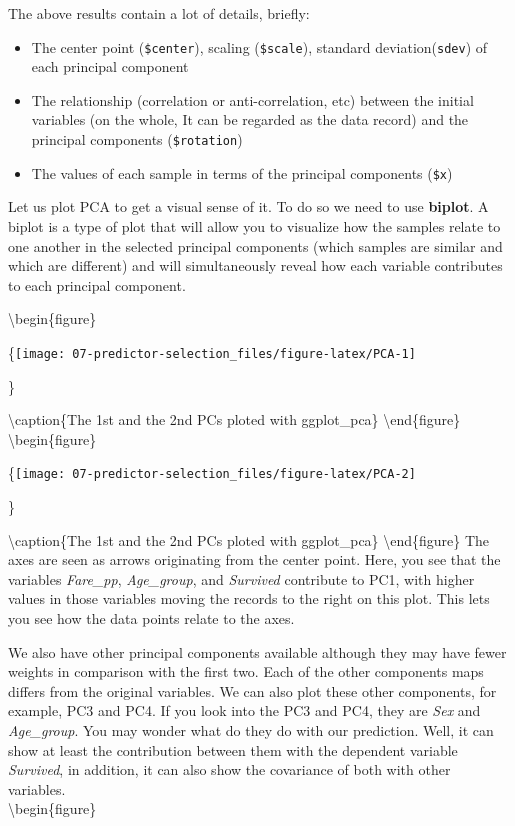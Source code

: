 \documentclass[
]{book}
\providecommand{\tightlist}{%
  \setlength{\itemsep}{0pt}\setlength{\parskip}{0pt}}
\begin{document}
The above results contain a lot of details, briefly:

\begin{itemize}
\tightlist
\item
  The center point (\texttt{\$center}), scaling (\texttt{\$scale}), standard deviation(\texttt{sdev}) of each principal component
\item
  The relationship (correlation or anti-correlation, etc) between the initial variables (on the whole, It can be regarded as the data record) and the principal components (\texttt{\$rotation})
\item
  The values of each sample in terms of the principal components (\texttt{\$x})
\end{itemize}

Let us plot PCA to get a visual sense of it. To do so we need to use \textbf{biplot}. A biplot is a type of plot that will allow you to visualize how the samples relate to one another in the selected principal components (which samples are similar and which are different) and will simultaneously reveal how each variable contributes to each principal component.

\textbackslash begin\{figure\}

\{\centering \texttt{[image: 07-predictor-selection\_files/figure-latex/PCA-1]}

\}

\textbackslash caption\{The 1st and the 2nd PCs ploted with ggplot\_pca\}\label{fig:PCA-1}
\textbackslash end\{figure\}
\textbackslash begin\{figure\}

\{\centering \texttt{[image: 07-predictor-selection\_files/figure-latex/PCA-2]}

\}

\textbackslash caption\{The 1st and the 2nd PCs ploted with ggplot\_pca\}\label{fig:PCA-2}
\textbackslash end\{figure\}
The axes are seen as arrows originating from the center point. Here, you see that the variables \emph{Fare\_pp}, \emph{Age\_group}, and \emph{Survived} contribute to PC1, with higher values in those variables moving the records to the right on this plot. This lets you see how the data points relate to the axes.

We also have other principal components available although they may have fewer weights in comparison with the first two. Each of the other components maps differs from the original variables. We can also plot these other components, for example, PC3 and PC4. If you look into the PC3 and PC4, they are \emph{Sex} and \emph{Age\_group}. You may wonder what do they do with our prediction. Well, it can show at least the contribution between them with the dependent variable \emph{Survived}, in addition, it can also show the covariance of both with other variables.\\
\textbackslash begin\{figure\}
\end{document}
